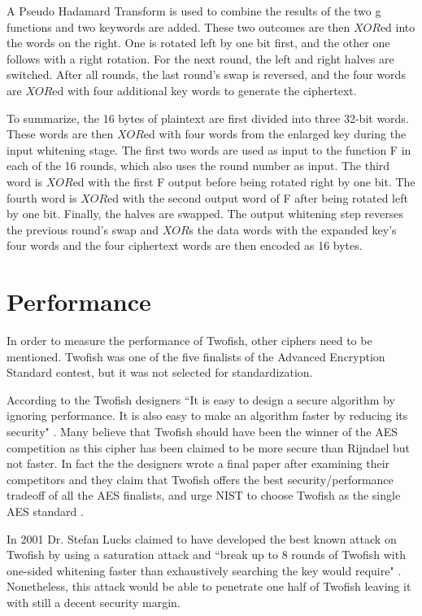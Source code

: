 \documentclass[11pt]{article}
\begin{document}
A Pseudo Hadamard Transform is used to combine the results of the two g functions and two keywords are added. These two outcomes are then \(XOR\)ed into the words on the right. One is rotated left by one bit first, and the other one follows with a right rotation. For the next round, the left and right halves are switched. After all rounds, the last round's swap is reversed, and the four words are \(XOR\)ed with four additional key words to generate the ciphertext.

To summarize, the 16 bytes of plaintext are first divided into three 32-bit words. These words are then \(XOR\)ed with four words from the enlarged key during the input whitening stage. The first two words are used as input to the function F in each of the 16 rounds, which also uses the round number as input. The third word is \(XOR\)ed with the first F output before being rotated right by one bit. The fourth word is \(XOR\)ed with the second output word of F after being rotated left by one bit. Finally, the halves are swapped. The output whitening step reverses the previous round's swap and \(XOR\)s the data words with the expanded key's four words and the four ciphertext words are then encoded as 16 bytes.

\section{Performance}
In order to measure the performance of Twofish, other ciphers need to be mentioned. Twofish was one of the five finalists of the Advanced Encryption Standard contest, but it was not selected for standardization.

According to the Twofish designers ``It is easy to design a secure algorithm by ignoring performance. It is also easy to make an algorithm faster by reducing its security" \cite{schneier2000twofish}. Many believe that Twofish should have been the winner of the AES competition as this cipher has been claimed to be more secure than Rijndael but not faster. In fact the the designers wrote a final paper after examining their competitors and they claim that Twofish offers the best security/performance tradeoff of all the AES finalists, and urge NIST to choose Twofish as the single AES standard \cite{schneier2000twofish}.

In 2001 Dr. Stefan Lucks claimed to have developed the best known attack on Twofish by using a saturation attack and ``break up to 8 rounds of Twofish with one-sided whitening faster than exhaustively searching the key would require" \cite{lucks2001saturation}. Nonetheless, this attack would be able to penetrate one half of Twofish leaving it with still a decent security margin.
\end{document}
